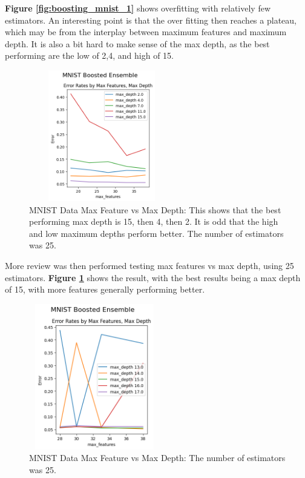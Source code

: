 \documentclass[letterpaper]{article} %
\begin{document}
\textbf{Figure \ref{fig:boosting_mnist_1}}  shows overfitting with relatively few estimators.  An interesting point is that the over fitting then reaches a plateau, which may be from the interplay between maximum features and maximum depth.  It is also a bit hard to make sense of the max depth, as the best performing are the low of 2,4, and high of 15. 

\begin{figure}[h]
\centering
\includegraphics[width=2.5in, height=2.25in]{figures/MNIST_Boosted_Ensemble_boosting_2.png}
\caption{MNIST Data Max Feature vs Max Depth:  This shows that the best performing max depth is 15, then 4, then 2.  It is odd that the high and low maximum depths perform better. The number of estimators was 25.  }
\label{fig:boosting_mnist_2}
\end{figure}

More review was then performed testing max features vs max depth, using 25 estimators. \textbf{Figure \ref{fig:boosting_mnist_2}} shows the result, with the best results being a max depth of 15, with more features generally performing better.

\begin{figure}[h]
\centering
\includegraphics[width=2.25in, height=2.5in]{figures/MNIST_Boosted_Ensemble_boosting_3.png}
\caption{MNIST Data Max Feature vs Max Depth:  The number of estimators was 25.  }
\label{fig:boosting_mnist_3}
\end{figure}
\end{document}
